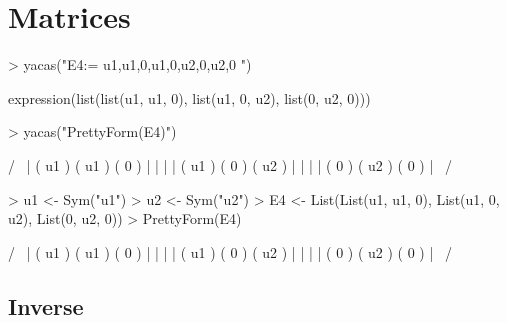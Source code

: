 \documentclass[]{article}
\begin{document}
\section{Matrices}
\label{sec:matrices}
\begin{Schunk}
\begin{Sinput}
> yacas("E4:={ {u1,u1,0},{u1,0,u2},{0,u2,0} }")
\end{Sinput}
\begin{Soutput}
expression(list(list(u1, u1, 0), list(u1, 0, u2), list(0, u2, 
    0)))
\end{Soutput}
\begin{Sinput}
> yacas("PrettyForm(E4)")
\end{Sinput}
\begin{Soutput}
/                       \
| ( u1 ) ( u1 ) ( 0 )   |
|                       |
| ( u1 ) ( 0 )  ( u2 )  |
|                       |
| ( 0 )  ( u2 ) ( 0 )   |
\                       /
\end{Soutput}
\end{Schunk}

\begin{Schunk}
\begin{Sinput}
> u1 <- Sym("u1")
> u2 <- Sym("u2")
> E4 <- List(List(u1, u1, 0), List(u1, 0, u2), List(0, u2, 0))
> PrettyForm(E4)
\end{Sinput}
\begin{Soutput}
/                       \
| ( u1 ) ( u1 ) ( 0 )   |
|                       |
| ( u1 ) ( 0 )  ( u2 )  |
|                       |
| ( 0 )  ( u2 ) ( 0 )   |
\                       /
\end{Soutput}
\end{Schunk}


\subsection{Inverse} 
\end{document}
